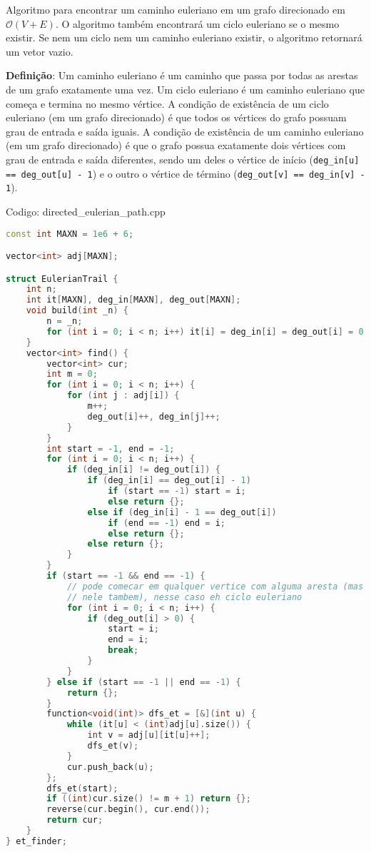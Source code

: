 \documentclass[10pt, a4paper, oneside]{book}
\begin{document}
Algoritmo para encontrar um caminho euleriano em um grafo direcionado em $\mathcal{O}(V + E)$. O algoritmo também encontrará um ciclo euleriano se o mesmo existir. Se nem um ciclo nem um caminho euleriano existir, o algoritmo retornará um vetor vazio.



\textbf{Definição}: Um caminho euleriano é um caminho que passa por todas as arestas de um grafo exatamente uma vez. Um ciclo euleriano é um caminho euleriano que começa e termina no mesmo vértice. A condição de existência de um ciclo euleriano (em um grafo direcionado) é que todos os vértices do grafo possuam grau de entrada e saída iguais. A condição de existência de um caminho euleriano (em um grafo direcionado) é que o grafo possua exatamente dois vértices com grau de entrada e saída diferentes, sendo um deles o vértice de início (\texttt{deg\_in[u] == deg\_out[u] - 1}) e o outro o vértice de término (\texttt{deg\_out[v] == deg\_in[v] - 1}).
\hfill

Codigo: directed\_eulerian\_path.cpp

\begin{lstlisting}[language=C++]
const int MAXN = 1e6 + 6;

vector<int> adj[MAXN];

struct EulerianTrail {
    int n;
    int it[MAXN], deg_in[MAXN], deg_out[MAXN];
    void build(int _n) {
        n = _n;
        for (int i = 0; i < n; i++) it[i] = deg_in[i] = deg_out[i] = 0;
    }
    vector<int> find() {
        vector<int> cur;
        int m = 0;
        for (int i = 0; i < n; i++) {
            for (int j : adj[i]) {
                m++;
                deg_out[i]++, deg_in[j]++;
            }
        }
        int start = -1, end = -1;
        for (int i = 0; i < n; i++) {
            if (deg_in[i] != deg_out[i]) {
                if (deg_in[i] == deg_out[i] - 1)
                    if (start == -1) start = i;
                    else return {};
                else if (deg_in[i] - 1 == deg_out[i])
                    if (end == -1) end = i;
                    else return {};
                else return {};
            }
        }
        if (start == -1 && end == -1) {
            // pode comecar em qualquer vertice com alguma aresta (mas tem que terminar
            // nele tambem), nesse caso eh ciclo euleriano
            for (int i = 0; i < n; i++) {
                if (deg_out[i] > 0) {
                    start = i;
                    end = i;
                    break;
                }
            }
        } else if (start == -1 || end == -1) {
            return {};
        }
        function<void(int)> dfs_et = [&](int u) {
            while (it[u] < (int)adj[u].size()) {
                int v = adj[u][it[u]++];
                dfs_et(v);
            }
            cur.push_back(u);
        };
        dfs_et(start);
        if ((int)cur.size() != m + 1) return {};
        reverse(cur.begin(), cur.end());
        return cur;
    }
} et_finder;
\end{lstlisting}
\hfill
\end{document}
